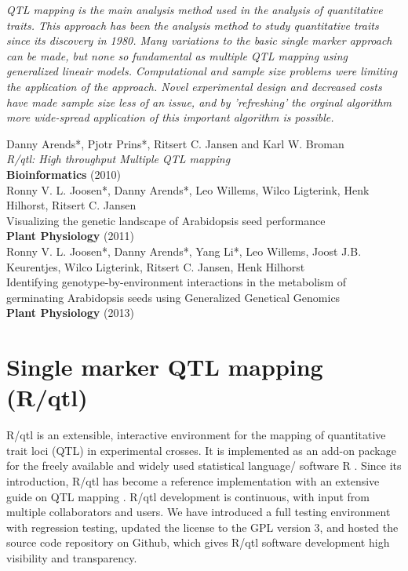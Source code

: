 \documentclass[8pt, twoside, a5paper]{report}
\newenvironment{myexampleblock}[1]{%
    \tcolorbox[beamer,%
    noparskip,breakable,
    colback=LightGreen,colframe=DarkGreen,%
    colbacklower=LimeGreen!75!LightGreen,%
    title=#1]}%
    {\endtcolorbox}
\newcommand{\authors}[1]{\small{#1}}
\newcommand{\bold}[1]{{\bfseries #1}}
\begin{document}
\emph{QTL mapping is the main analysis method used in the analysis of quantitative traits. This approach has been 
the analysis method to study quantitative traits since its discovery in 1980. Many variations to the basic single 
marker approach can be made, but none so fundamental as multiple QTL mapping using generalized lineair models. 
Computational and sample size problems were limiting the application of the approach. Novel experimental 
design and decreased costs have made sample size less of an issue, and by 'refreshing' the orginal algorithm 
more wide-spread application of this important algorithm is possible.}
\null
\vfill

\begin{myexampleblock}{Originally published as:}
  \authors{Danny Arends*, Pjotr Prins*, Ritsert C. Jansen and Karl W. Broman}\\
  \emph{R/qtl: High throughput Multiple QTL mapping}\\
  \bold{Bioinformatics} (2010) \\

  \authors{Ronny V. L. Joosen*, Danny Arends*, Leo Willems, Wilco Ligterink, Henk Hilhorst, Ritsert C. Jansen}\\
  Visualizing the genetic landscape of Arabidopsis seed performance\\
  \bold{Plant Physiology} (2011)\\

  \authors{Ronny V. L. Joosen*, Danny Arends*, Yang Li*, Leo Willems, Joost J.B. Keurentjes, Wilco Ligterink, 
  Ritsert C. Jansen, Henk Hilhorst}\\
  Identifying genotype-by-environment interactions in the metabolism of germinating Arabidopsis seeds using 
  Generalized Genetical Genomics\\
  \bold{Plant Physiology} (2013)
\end{myexampleblock}

\newpage

\section{Single marker QTL mapping (R/qtl)}

R/qtl is an extensible, interactive environment for the mapping of quantitative trait loci (QTL) in experimental 
crosses. It is implemented as an add-on package for the freely available and widely used statistical language/
software R \cite{R:2009}. Since its introduction, R/qtl \cite{Broman:2003} has become a
reference implementation with an extensive guide on QTL mapping \cite{RQTLGuide:2009}. R/qtl development is 
continuous, with input from multiple collaborators and users.  We have introduced a full testing environment with 
regression testing, updated the license to the GPL version 3, and hosted the source code repository on Github,
which gives R/qtl software development high visibility and transparency. 
\end{document}
